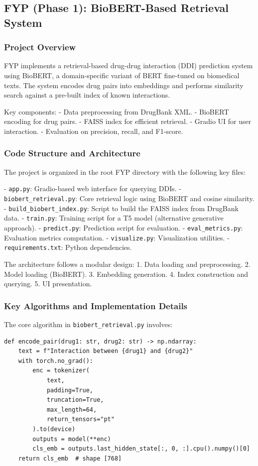\documentclass[12pt,a4paper]{article}
\begin{document}
\subsection{FYP (Phase 1): BioBERT-Based Retrieval System}
\label{subsec:fyp_analysis}

\subsubsection{Project Overview}
FYP implements a retrieval-based drug-drug interaction (DDI) prediction system using BioBERT, a domain-specific variant of BERT fine-tuned on biomedical texts. The system encodes drug pairs into embeddings and performs similarity search against a pre-built index of known interactions.

Key components:
- Data preprocessing from DrugBank XML.
- BioBERT encoding for drug pairs.
- FAISS index for efficient retrieval.
- Gradio UI for user interaction.
- Evaluation on precision, recall, and F1-score.

\subsubsection{Code Structure and Architecture}
The project is organized in the root FYP directory with the following key files:

- \texttt{app.py}: Gradio-based web interface for querying DDIs.
- \texttt{biobert\_retrieval.py}: Core retrieval logic using BioBERT and cosine similarity.
- \texttt{build\_biobert\_index.py}: Script to build the FAISS index from DrugBank data.
- \texttt{train.py}: Training script for a T5 model (alternative generative approach).
- \texttt{predict.py}: Prediction script for evaluation.
- \texttt{eval\_metrics.py}: Evaluation metrics computation.
- \texttt{visualize.py}: Visualization utilities.
- \texttt{requirements.txt}: Python dependencies.

The architecture follows a modular design:
1. Data loading and preprocessing.
2. Model loading (BioBERT).
3. Embedding generation.
4. Index construction and querying.
5. UI presentation.

\subsubsection{Key Algorithms and Implementation Details}
The core algorithm in \texttt{biobert\_retrieval.py} involves:

\begin{lstlisting}
def encode_pair(drug1: str, drug2: str) -> np.ndarray:
    text = f"Interaction between {drug1} and {drug2}"
    with torch.no_grad():
        enc = tokenizer(
            text,
            padding=True,
            truncation=True,
            max_length=64,
            return_tensors="pt"
        ).to(device)
        outputs = model(**enc)
        cls_emb = outputs.last_hidden_state[:, 0, :].cpu().numpy()[0]
    return cls_emb  # shape [768]
\end{lstlisting}
\end{document}
